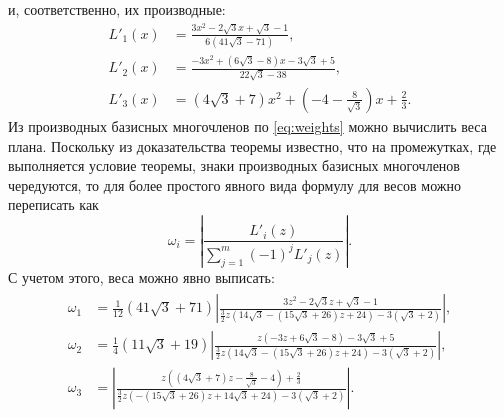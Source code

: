 \documentclass[specialist,
               substylefile = spbu.rtx,
               subf,href,colorlinks=true, 12pt]{disser}
\theoremstyle{definition}
\newcommand\abs[1]{\left\lvert#1\right\rvert}
\begin{document}
	и, соответственно, их производные:
	\begin{align*}
		L'_1(x) &= \frac{3 x^2-2 \sqrt{3} x+\sqrt{3}-1}{6 \left(41 \sqrt{3}-71\right)}, \\
		L'_2(x) &= \frac{-3 x^2+\left(6 \sqrt{3}-8\right) x-3 \sqrt{3}+5}{22 \sqrt{3}-38}, \\
		L'_3(x) &= \left(4 \sqrt{3}+7\right) x^2+\left(-4-\frac{8}{\sqrt{3}}\right) x+\frac{2}{3}.
	\end{align*}
	Из производных базисных многочленов по \eqref{eq:weights} можно вычислить веса плана. Поскольку из доказательства теоремы известно, что на промежутках, где выполняется условие теоремы, знаки производных базисных многочленов чередуются, то для более простого явного вида формулу для весов можно переписать как
	\begin{equation*}
		\omega_i = \abs{\frac{L'_i(z)}{\sum_{j=1}^m (-1)^j L'_j(z)}}.
	\end{equation*}
	С учетом этого, веса можно явно выписать:
	\begin{align}
	\label{eq:ex:w}
	\begin{split}
		\omega_1 &= \frac{1}{12} \left(41 \sqrt{3}+71\right) \left| \frac{3 z^2-2 \sqrt{3} z+\sqrt{3}-1}{\frac{3}{2} z \left(14 \sqrt{3}-\left(15 \sqrt{3}+26\right) z+24\right)-3 \left(\sqrt{3}+2\right)}\right|, \\
		\omega_2 &=  \frac{1}{4} \left(11 \sqrt{3}+19\right) \left| \frac{z \left(-3 z+6 \sqrt{3}-8\right)-3 \sqrt{3}+5}{\frac{3}{2} z \left(14 \sqrt{3}-\left(15 \sqrt{3}+26\right) z+24\right)-3 \left(\sqrt{3}+2\right)}\right|, \\
		\omega_3 &= \left| \frac{z \left(\left(4 \sqrt{3}+7\right) z-\frac{8}{\sqrt{3}}-4\right)+\frac{2}{3}}{\frac{3}{2} z \left(-\left(15 \sqrt{3}+26\right) z+14 \sqrt{3}+24\right)-3 \left(\sqrt{3}+2\right)}\right|.
	\end{split}
	\end{align}
	
\end{document}
